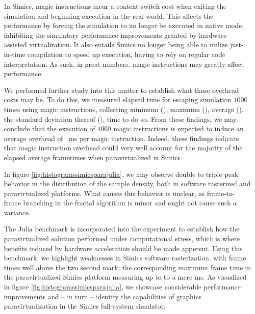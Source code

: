 In Simics, magic instructions incur a context switch cost when exiting the simulation and beginning execution in the real world.
This affects the performance by forcing the simulation to no longer be executed in native mode, inhibiting the simulatory performance improvements granted by hardware-assisted virtualization.
It also entails Simics no longer being able to utilize just-in-time compilation to speed up execution, having to rely on regular code interpretation.
As such, in great numbers, magic instructions may greatly affect performance.

We performed further study into this matter to establish what those overhead costs may be.
To do this, we measured elapsed time for escaping simulation $1000$ times using magic instructions, collecting minimum (), maximum (), average (), the standard deviation thereof (), time to do so.
From these findings, we may conclude that the execution of $1000$ magic instructions is expected to induce an average overhead of ~ms per magic instruction.
Indeed, these findings indicate that magic instruction overhead could very well account for the majority of the elapsed average frametimes when paravirtualized in Simics.

In figure \ref{fig:histogramssimicsparajulia}, we may observe double to triple peak behavior in the distribution of the sample density, both in software rasterized and paravirtualized platforms.
What causes this behavior is unclear, as frame-to-frame branching in the fractal algorithm is minor and ought not cause such a variance.

The Julia benchmark is incorporated into the experiment to establish how the paravirtualized solution performed under computational stress, which is where benefits induced by hardware acceleration should be made apperent.
Using this benchmark, we highlight weaknesses in Simics software rasterization, with frame times well above the two second mark; the corresponding maximum frame time in the paravirtualized Simics platform measuring up to to a mere  ms.
As visualized in figure \ref{fig:histogramssimicsparajulia}, we showcase considerable performance improvements and -- in turn -- identify the capabilities of graphics paravirtualization in the Simics full-system simulator.

